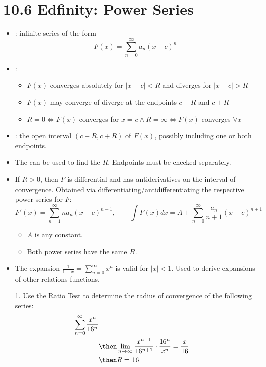 \section{10.6 Edfinity: Power Series}
\begin{itemize}
  \item {}: infinite series of the form
    \[%
    F (x) = \sum_{n=0}^{\infty} a_n (x - c)^n
    \]%
  \item {}:
    \begin{itemize}
      \item \(F(x)\) converges absolutely for \(\left|x -c \right| < R\) and
        diverges for \(\left|x - c\right| > R\)
      \item \(F (x) \) may converge of diverge at the endpoints \(c-R\) and \(c+R\)
      \item \(R=0 \iff F (x) \) converges for \(x = c \land R = \infty \iff F
        (x)\) converges \(\forall x\)
    \end{itemize}
  \item {}: the open interval \((c-R, c+R)\) of
    \(F(x) \), possibly including one or both endpoints.

  \item The  can be used to find the \(R\). Endpoints must be
    checked separately.

  \item If \(R > 0\), then \(F\) is differential and has antiderivatives on the
    interval of convergence. Obtained via differentiating/antidifferentiating
    the respective power series for \(F\):
    \[%
    F' (x) = \sum_{n=1}^{\infty} n a_n (x - c)^{n-1}, \qquad
    \int F (x) dx = A + \sum_{n=0}^{\infty} \frac{a_n}{n+1}(x-c)^{n+1}
    \]%
    \begin{itemize}
      \item \(A\) is any constant.
      \item Both power series have the same \(R\).
    \end{itemize}

  \item The expansion \(\displaystyle \frac{1}{1-x} = \sum_{n=0}^{\infty} x^n
    \) is valid for \(|x| < 1\). Used to derive expansions of other relations
    functions.

  \item[1.] Use the Ratio Test to determine the radius of convergence of the
    following series:
    \begin{align*}
      \sum_{n=0}^{\infty} \frac{x^n}{16^n} \\
      &\then \lim_{n \to \infty}\frac{x^{n+1}}{16^{n+1}} \cdot \frac{16^n}{x^n}
      = \frac{x}{16} \\
      &\then R = 16
    \end{align*}


\end{itemize}
